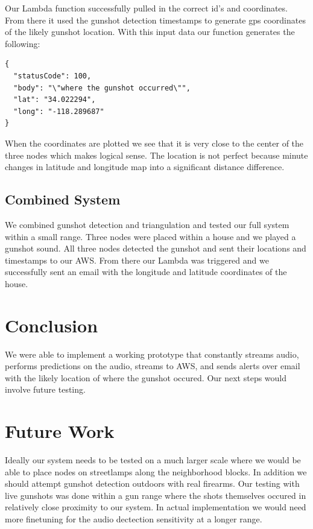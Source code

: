\documentclass[conference]{IEEEtran}
\begin{document}
Our Lambda function successfully pulled in the  correct id's and coordinates. From there it used the gunshot detection timestamps to generate gps coordinates of the likely gunshot location. With this input data our function generates the following:


\begin{small}
\begin{verbatim}
{
  "statusCode": 100,
  "body": "\"where the gunshot occurred\"",
  "lat": "34.022294",
  "long": "-118.289687"
}
\end{verbatim}
\end{small}

When the coordinates are plotted we see that it is very close to the center of the three nodes which makes logical sense. The location is not perfect because minute changes in latitude and longitude map into a significant distance difference.

\subsection{Combined System}
We combined gunshot detection and triangulation and tested our full system within a small range. Three nodes were placed within a house and we played a gunshot sound. All three nodes detected the gunshot and sent their locations and timestamps to our AWS. From there our Lambda was triggered and we successfully sent an email with the longitude and latitude coordinates of the house.

\section{Conclusion}
We were able to implement a working prototype that constantly streams audio, performs predictions on the audio, streams to AWS, and sends alerts over email with the  likely location of where the gunshot occured. Our next steps would involve future testing.
\section{Future Work}
Ideally our system needs to be tested on a much larger scale where we would be able to place nodes on streetlamps along the neighborhood blocks. In addition we should attempt gunshot detection outdoors with real firearms. Our testing with live gunshots was done within a gun range where the shots themselves occured in relatively close proximity to our system. In actual implementation we would need more finetuning for the audio dectection sensitivity at a longer range.
\end{document}
